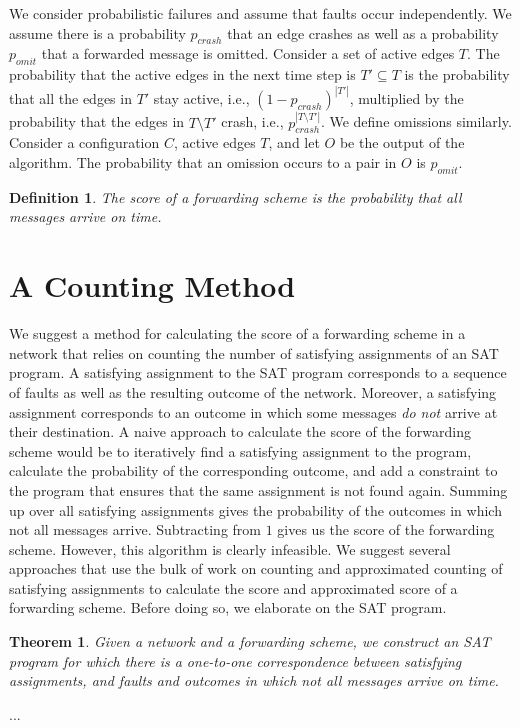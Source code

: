 \documentclass[11pt,eepic]{article}
\newtheorem{theorem}{Theorem}[section]
\newtheorem{definition}{Definition}[section]
\def\eod{\vrule height 6pt width 5pt depth 0pt}
\newenvironment{proof}{\noindent {\bf Proof:} \hspace{.677em}}
	                      {\hspace*{\fill}{\eod}}
\begin{document}
		We consider probabilistic failures and assume that faults occur independently. We assume there is a probability $p_{crash}$ that an edge crashes as well as a probability $p_{omit}$ that a forwarded message is omitted. Consider a set of active edges $T$. The probability that the active edges in the next time step is $T' \subseteq T$ is the probability that all the edges in $T'$ stay active, i.e., $(1-p_{crash})^{|T'|}$, multiplied by the probability that the edges in $T \setminus T'$ crash, i.e., $p_{crash}^{|T \setminus T'|}$. We define omissions similarly. Consider a configuration $C$, active edges $T$, and let $O$ be the output of the algorithm. The probability that an omission occurs to a pair in $O$ is $p_{omit}$.

		\begin{definition}
		The score of a forwarding scheme is the probability that all messages arrive on time.
		\end{definition}





\section{A Counting Method}
\label{sec:counting}
	We suggest a method for calculating the score of a forwarding scheme in a network that relies on counting the number of satisfying assignments of an SAT program. A satisfying assignment to the SAT program corresponds to a sequence of faults as well as the resulting outcome of the network. Moreover, a satisfying assignment corresponds to an outcome in which some messages {\em do not} arrive at their destination. A naive approach to calculate the score of the forwarding scheme would be to iteratively find a satisfying assignment to the program, calculate the probability of the corresponding outcome, and add a constraint to the program that ensures that the same assignment is not found again. Summing up over all satisfying assignments gives the probability of the outcomes in which not all messages arrive. Subtracting from $1$ gives us the score of the forwarding scheme. However, this algorithm is clearly infeasible. We suggest several approaches that use the bulk of work on counting and approximated counting of satisfying assignments to calculate the score and approximated score of a forwarding scheme. Before doing so, we elaborate on the SAT program.

	\begin{theorem}
	\label{thm:fault seq}
	Given a network and a forwarding scheme, we construct an SAT program for which there is a one-to-one correspondence between satisfying assignments, and faults and outcomes in which not all messages arrive on time.
	\end{theorem}
	\begin{proof}
	...
	\end{proof}
\end{document}
